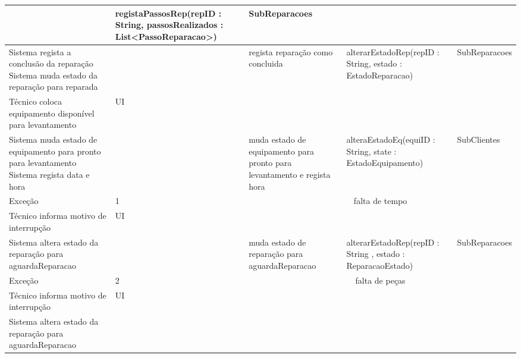 \documentclass[../relatorio.tex]{subfiles}
\begin{document}
\begin{landscape}
\begin{table}[!h]
\begin{tabular}{|p{5cm}|p{1cm}|p{4cm}|p{6cm}|p{3cm}|}
                     & registaPassosRep(repID : String, passosRealizados : List<PassoReparacao>)
                     & SubReparacoes
            \\
            \hline
            Sistema regista a conclusão da reparação
            Sistema muda estado da reparação para reparada
                     & 
                     & regista reparação como concluida
                     & alterarEstadoRep(repID : String, estado : EstadoReparacao)
                     & SubReparacoes
            \\
            \hline
            Técnico coloca equipamento disponível para levantamento
                     & UI
                     & 
                     & 
                     & 
            \\
            \hline
            Sistema muda estado de equipamento para pronto para levantamento
            Sistema regista data e hora
                     & 
                     & muda estado de equipamento para pronto para levantamento e regista hora
                     & alteraEstadoEq(equiID : String, state : EstadoEquipamento)
                     & SubClientes
            \\
            \hline
            \rowcolor{red!30}
            Exceção  & 1                                                 &  \multicolumn{3}{c}{falta de tempo}\\
            \hline
            \rowcolor{yellow}
            Técnico informa motivo de interrupção
                     & UI
                     & 
                     & 
                     & 
            \\
            \hline
            Sistema altera estado da reparação para aguardaReparacao
                     & 
                     & muda estado de reparação para aguardaReparacao
                     & alterarEstadoRep(repID : String , estado : ReparacaoEstado)
                     & SubReparacoes
            \\
            \hline
            \rowcolor{red!30}
            Exceção  & 2                                                 &  \multicolumn{3}{c}{falta de peças}\\
            \hline
            \rowcolor{yellow}
            Técnico informa motivo de interrupção
                     & UI
                     & 
                     & 
                     & 
            \\
            \hline
            Sistema altera estado da reparação para aguardaReparacao
                     & 

\end{tabular}
\end{table}
\end{landscape}
\end{document}
